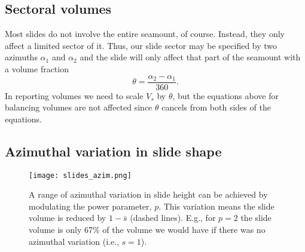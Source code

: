\documentclass[12pt,letterpaper,margin=0.5in]{report}
\begin{document}
\subsection{Sectoral volumes}
Most slides do not involve the entire seamount, of course. Instead, they only affect a limited sector of it.  Thus, our slide sector may be specified by two
azimuths $\alpha_1$ and $\alpha_2$ and the slide will only affect that part of the seamount with a volume fraction
\begin{equation}
\theta = \frac{\alpha_2 - \alpha_1}{360}.
\end{equation}
In reporting volumes we need to scale $V_s$ by $\theta$, but the equations above for balancing volumes are not affected since $\theta$ cancels from both sides of the equations.

\subsection{Azimuthal variation in slide shape}

\begin{figure}[h!]
  \centering
  \texttt{[image: slides\_azim.png]}
  \caption{A range of azimuthal variation in slide height can be achieved by modulating the power parameter, $p$. This variation
  means the slide volume is reduced by $1 - \bar{s}$ (dashed lines). E.g., for $p = 2$ the slide volume is only 67\% of the
  volume we would have if there was no azimuthal variation (i.e., $s = 1$).}
  \label{slides_azim}
\end{figure}
\end{document}
